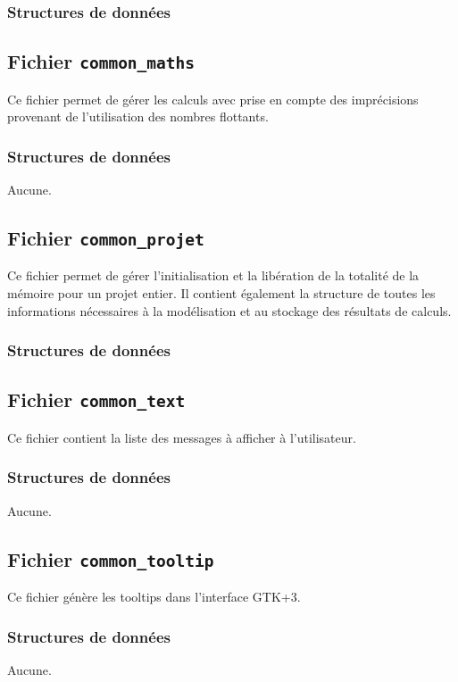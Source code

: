 \documentclass{article}
\begin{document}
\subsubsection{Structures de données}


\subsection{Fichier {\texttt{common\_maths}}}
Ce fichier permet de gérer les calculs avec prise en compte des imprécisions provenant de l'utilisation des nombres flottants.
\subsubsection{Structures de données}
Aucune.

\subsection{Fichier {\texttt{common\_projet}}}
Ce fichier permet de gérer l'initialisation et la libération de la totalité de la mémoire pour un projet entier. Il contient également la structure de toutes les informations nécessaires à la modélisation et au stockage des résultats de calculs.
\subsubsection{Structures de données}


\subsection{Fichier {\texttt{common\_text}}}
Ce fichier contient la liste des messages à afficher à l'utilisateur.
\subsubsection{Structures de données}
Aucune.

\subsection{Fichier {\texttt{common\_tooltip}}}
Ce fichier génère les tooltips dans l'interface GTK+3.
\subsubsection{Structures de données}
Aucune.

\end{document}
